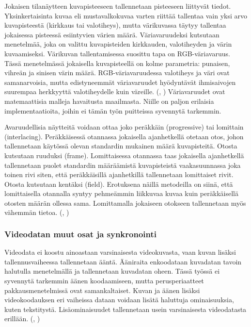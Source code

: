 Jokaisen tilanäytteen kuvapisteeseen tallennetaan pisteeseen liittyvät
tiedot. Yksinkertaisinta kuvaa eli mustavalkokuvaa varten riittää
tallentaa vain yksi arvo kuvapisteestä (kirkkaus tai valotiheys), mutta
värikuvassa täytyy tallentaa jokaisessa pisteessä esiintyvien värien määrä.
Väriavaruudeksi kutsutaan menetelmää, joka on valittu kuvapisteiden kirkkauden,
valotiheyden ja värin kuvaamiseksi. Värikuvan tallentamisessa suosittu tapa on
RGB-väriavaruus. Tässä menetelmässä jokaisella kuvapisteellä on
kolme parametria: punaisen, vihreän ja sinisen värin määrä. RGB-väriavaruudessa 
valotiheys ja väri ovat samanarvoisia, mutta edistyneemmät
väriavaruudet hyödyntävät ihmisaivojen suurempaa herkkyyttä valotiheydelle
kuin väreille. (\citealt{h264}, \citealt{du}) Väriavaruudet ovat matemaattisia
malleja havaitusta maailmasta. Niille on paljon erilaisia implementaatioita,
joihin ei tämän työn puitteissa syvennytä tarkemmin.

Avaruudellisia näytteitä voidaan ottaa joko peräkkäin (progressive) tai
lomittain (interlacing). Peräkkäisessä otannassa jokaisella ajanhetkellä
otetaan otos, johon tallennetaan käytössä olevan standardin mukainen
määrä kuvapisteitä. Otosta kutsutaan ruuduksi (frame). Lomittaisessa
otannassa taas jokaisella ajanhetkellä tallennetaan puolet standardin
määräämistä kuvapisteistä vaakasuunnassa joka toinen rivi siten, että
peräkkäisillä ajanhetkillä tallennetaan lomittaiset rivit. Otosta kutsutaan
kentäksi (field). Erotuksena näillä metodeilla on siinä, että lomittaisella
otannalla syntyy pehmeämmin liikkuvaa kuvaa kuin peräkkäisellä otosten määrän
ollessa sama. Lomittamalla jokaiseen otokseen tallennetaan myös vähemmän tietoa.
(\citealt{h264}, \citealt{du})

\subsubsection{Videodatan muut osat ja synkronointi}

Videodata ei koostu ainoastaan varsinaisesta videokuvasta, vaan kuvan lisäksi
tallennusvaiheessa tallennetaan ääntä. Ääniraita enkoodataan kuvadatan tavoin
halutulla menetelmällä ja tallennetaan kuvadatan oheen. Tässä
työssä ei syvennytä tarkemmin äänen koodaamiseen, mutta perusperiaatteet
pakkausmenetelmissä ovat samankaltaiset. Kuvan ja äänen lisäksi videokoodauksen
eri vaiheissa dataan voidaan lisätä haluttuja ominaisuuksia, kuten tekstitystä.
Lisäominaisuudet tallennetaan usein varsinaisesta videodatasta erillään. (\citealt{mpeg_app},
\citealt{mujal})
 
